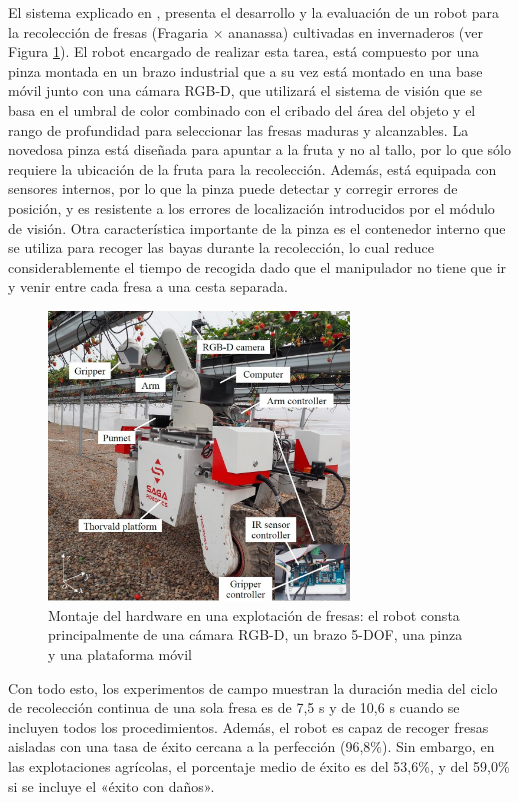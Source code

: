 El sistema explicado en \cite{Xiong19}, presenta el desarrollo y la evaluación de un robot para la recolección de fresas (Fragaria × ananassa) cultivadas en invernaderos (ver Figura \ref{fig:Robot_Xiong}). El robot encargado de realizar esta tarea, está compuesto por una pinza montada en un brazo industrial que a su vez está montado en una base móvil junto con una cámara RGB-D, que utilizará el sistema de visión que se basa en el umbral de color combinado con el cribado del área del objeto y el rango de profundidad para seleccionar las fresas maduras y alcanzables. La novedosa pinza está diseñada para apuntar a la fruta y no al tallo, por lo que sólo requiere la ubicación de la fruta para la recolección. Además, está equipada con sensores internos, por lo que la pinza puede detectar y corregir errores de posición, y es resistente a los errores de localización introducidos por el módulo de visión. Otra característica importante de la pinza es el contenedor interno que se utiliza para recoger las bayas durante la recolección, lo cual reduce considerablemente el tiempo de recogida dado que el manipulador no tiene que ir y venir entre cada fresa a una cesta separada.

\begin{figure} [H]
    \begin{center}
      \includegraphics[width=8cm]{figs/Hardware assembly in a strawberry farm.jpg}
    \end{center}
    \caption{Montaje del hardware en una explotación de fresas: el robot consta principalmente de una cámara RGB-D, un brazo 5-DOF, una pinza y una plataforma móvil}
    \label{fig:Robot_Xiong}
\end{figure}

Con todo esto, los experimentos de campo muestran la duración media del ciclo de recolección continua de una sola fresa es de 7,5 s y de 10,6 s cuando se incluyen todos los procedimientos. Además, el robot es capaz de recoger fresas aisladas con una tasa de éxito cercana a la perfección (96,8\%). Sin embargo, en las explotaciones agrícolas, el porcentaje medio de éxito es del 53,6\%, y del 59,0\% si se incluye el «éxito con daños». \\

